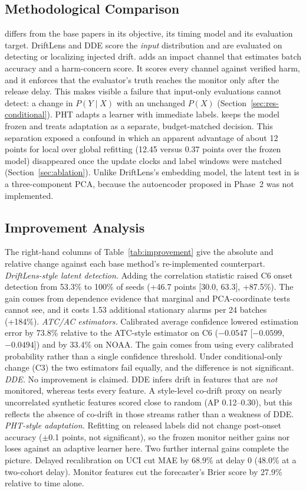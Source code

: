 \subsection{Methodological Comparison}
\idm{} differs from the base papers in its objective, its timing model and its
evaluation target. DriftLens and DDE score the \emph{input} distribution and are
evaluated on detecting or localizing injected drift. \idm{} adds an impact channel that
estimates batch accuracy and a harm-concern score. It scores every channel against
verified harm, and it enforces that the evaluator's truth reaches the monitor only
after the release delay. This makes visible a failure that input-only evaluations
cannot detect: a change in $P(Y\mid X)$ with an unchanged $P(X)$ (Section~\ref{sec:res-conditional}).
PHT adapts a learner with immediate labels. \idm{} keeps the model frozen and treats
adaptation as a separate, budget-matched decision. This separation exposed a confound
in which an apparent advantage of about 12 points for local over global refitting (12.45
versus 0.37 points over the frozen model) disappeared once the update clocks and label windows were matched (Section~\ref{sec:ablation}). Unlike DriftLens's
embedding model, the latent test in \idm{} is a three-component PCA, because the
autoencoder proposed in Phase~2 was not implemented.

\subsection{Improvement Analysis}
The right-hand columns of Table~\ref{tab:improvement} give the absolute and relative
change against each base method's re-implemented counterpart.
\emph{DriftLens-style latent detection.} Adding the correlation statistic raised C6
onset detection from 53.3\% to 100\% of seeds (+46.7 points [30.0, 63.3], +87.5\%).
The gain comes from dependence evidence that marginal and PCA-coordinate tests cannot
see, and it costs 1.53 additional stationary alarms per 24 batches (+184\%).
\emph{ATC/AC estimators.} Calibrated average confidence lowered estimation error by
73.8\% relative to the ATC-style estimator on C6 ($-0.0547$ [$-0.0599$, $-0.0494$]) and
by 33.4\% on NOAA. The gain comes from using every calibrated probability rather than
a single confidence threshold. Under conditional-only change (C3) the two estimators
fail equally, and the difference is not significant. \emph{DDE.} No improvement is
claimed. DDE infers drift in features that are \emph{not} monitored, whereas \idm{}
tests every feature. A style-level co-drift proxy on nearly uncorrelated synthetic
features scored close to random (AP 0.12--0.30), but this reflects the absence of
co-drift in those streams rather than a weakness of DDE.
\emph{PHT-style adaptation.} Refitting on released labels did not change post-onset
accuracy ($\pm$0.1 points, not significant), so the frozen monitor neither gains nor
loses against an adaptive learner here. Two further internal gains complete the
picture. Delayed recalibration on UCI cut MAE by 68.9\% at delay 0 (48.0\% at a
two-cohort delay). Monitor features cut the forecaster's Brier score by 27.9\%
relative to time alone.

